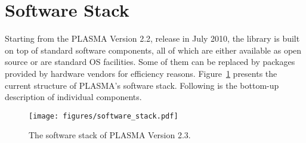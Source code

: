 
\section{Software Stack}

Starting from the PLASMA Version 2.2, release in July 2010, the library is built on top of standard
software components, all of which are either available as open source or are standard OS facilities.
Some of them can be replaced by packages provided by hardware vendors for efficiency reasons.
Figure~\ref{fig:software_stack} presents the current structure of PLASMA's software stack.
Following is the \mbox{bottom-up} description of individual components.

\begin{figure}[h!]
\centering
\texttt{[image: figures/software\_stack.pdf]}
\caption{The software stack of PLASMA Version 2.3.}
\label{fig:software_stack}
\end{figure}

